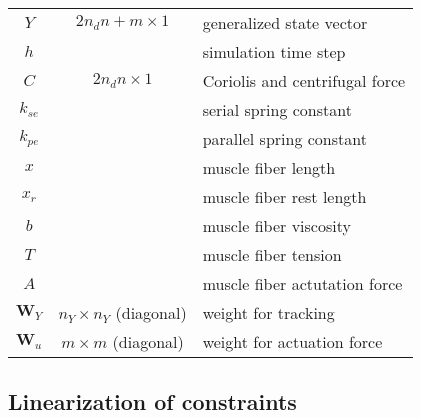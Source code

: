 \documentclass[a4paper,10pt]{article}
\begin{document}
\begin{table}[h!b!p!]
\begin{tabular}{ c c l }
$Y$              & $2n_d n + m\times 1$                     & generalized state vector\\
$h$              &                                          & simulation time step\\
$C$              & $2n_d n    \times 1$                     & Coriolis and centrifugal force\\
$k_{se}$         &                                          & serial spring constant\\
$k_{pe}$         &                                          & parallel spring constant\\
$x$              &                                          & muscle fiber length\\
$x_r$            &                                          & muscle fiber rest length\\
$b$              &                                          & muscle fiber viscosity\\
$T$              &                                          & muscle fiber tension\\
$A$              &                                          & muscle fiber actutation force\\
$\mathbf{W}_Y$   &     $n_Y \times n_Y$ (diagonal)   & weight for tracking\\
$\mathbf{W}_u$   &     $ m  \times  m $ (diagonal)   & weight for actuation force\\
\hline
\end{tabular}
\end{table}

\subsection{Linearization of constraints}
\end{document}
